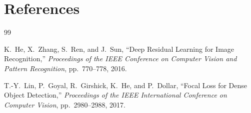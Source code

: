 
\chapter*{References}
\label{ch:references}

\begin{thebibliography}{99}

K.~He, X.~Zhang, S.~Ren, and J.~Sun,
``Deep Residual Learning for Image Recognition,''
\textit{Proceedings of the IEEE Conference on Computer Vision and Pattern Recognition},
pp.~770--778, 2016.

T.-Y.~Lin, P.~Goyal, R.~Girshick, K.~He, and P.~Dollar,
``Focal Loss for Dense Object Detection,''
\textit{Proceedings of the IEEE International Conference on Computer Vision},
pp.~2980--2988, 2017.

\end{thebibliography}
